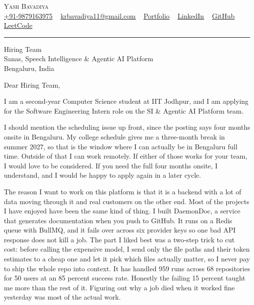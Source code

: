\documentclass[letterpaper,10pt]{article}
\begin{document}
\begin{center}
    {\Huge \scshape Yash Bavadiya} \\ \vspace{3pt}
    \small \href{tel:+91-9879163975}{\underline{+91-9879163975}} ~
    \href{mailto:krbavadiya11@gmail.com}{\underline{krbavadiya11@gmail.com}} ~
    \href{https://www.xevrion.dev/}{\underline{Portfolio}} ~
    \href{https://linkedin.com/in/yash-bavadiya}{\underline{LinkedIn}} ~
    \href{https://github.com/xevrion}{\underline{GitHub}} ~
    \href{https://leetcode.com/u/xevrion/}{\underline{LeetCode}}
\end{center}
\vspace{-6pt}
{\color{black}\hrule}
\vspace{10pt}

Hiring Team \\
Sanas, Speech Intelligence \& Agentic AI Platform \\
Bengaluru, India

\vspace{4pt}

Dear Hiring Team,

I am a second-year Computer Science student at IIT Jodhpur, and I am applying for the Software Engineering Intern role on the SI \& Agentic AI Platform team.

I should mention the scheduling issue up front, since the posting says four months onsite in Bengaluru. My college schedule gives me a three-month break in summer 2027, so that is the window where I can actually be in Bengaluru full time. Outside of that I can work remotely. If either of those works for your team, I would love to be considered. If you need the full four months onsite, I understand, and I would be happy to apply again in a later cycle.

The reason I want to work on this platform is that it is a backend with a lot of data moving through it and real customers on the other end. Most of the projects I have enjoyed have been the same kind of thing. I built DaemonDoc, a service that generates documentation when you push to GitHub. It runs on a Redis queue with BullMQ, and it fails over across six provider keys so one bad API response does not kill a job. The part I liked best was a two-step trick to cut cost: before calling the expensive model, I send only the file paths and their token estimates to a cheap one and let it pick which files actually matter, so I never pay to ship the whole repo into context. It has handled 959 runs across 68 repositories for 50 users at an 85 percent success rate. Honestly the failing 15 percent taught me more than the rest of it. Figuring out why a job died when it worked fine yesterday was most of the actual work.
\end{document}
